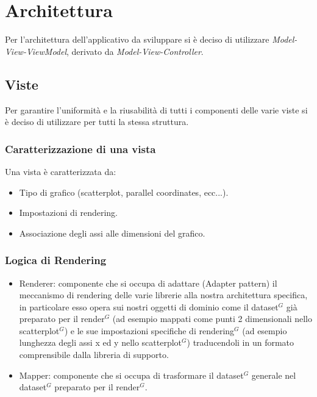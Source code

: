 \section{Architettura}

Per l'architettura dell'applicativo da sviluppare si è deciso di utilizzare
\textit{Model-View-ViewModel}, derivato da \textit{Model-View-Controller}.

\subsection{Viste}
Per garantire l'uniformità e la riusabilità di tutti i componenti delle varie
viste si è deciso di utilizzare per tutti la stessa struttura.

\subsubsection{Caratterizzazione di una vista}
Una vista è caratterizzata da:
\begin{itemize}
  \item Tipo di grafico (scatterplot, parallel coordinates, ecc...).
  \item Impostazioni di rendering.
  \item Associazione degli assi alle dimensioni del grafico.
\end{itemize}

\subsubsection{Logica di Rendering}
\begin{itemize}
  \item Renderer: componente che si occupa di adattare (Adapter pattern) il
    meccanismo di rendering delle varie librerie alla nostra architettura
    specifica, in particolare esso opera sui nostri oggetti di dominio come il
    dataset$^{G}$ già preparato per il render$^{G}$ (ad esempio mappati come punti 2
    dimensionali nello scatterplot$^{G}$) e le sue impostazioni specifiche di
    rendering$^{G}$ (ad esempio lunghezza degli assi x ed y nello scatterplot$^{G}$)
    traducendoli in un formato comprensibile dalla libreria di supporto.
  \item Mapper: componente che si occupa di trasformare il dataset$^{G}$ generale nel
    dataset$^{G}$ preparato per il render$^{G}$.
\end{itemize}


